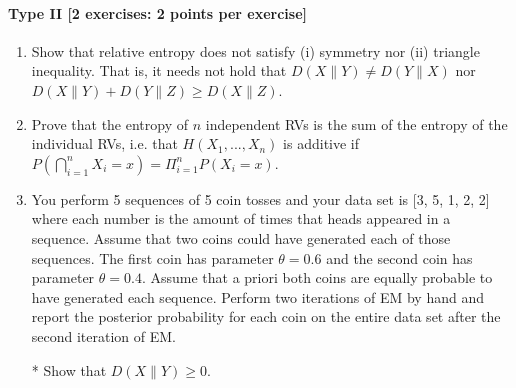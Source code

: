 \documentclass{article}
\begin{document}
\paragraph{Type II [2 exercises: 2 points per exercise]}
\begin{enumerate}
	\item Show that relative entropy does not satisfy (i) symmetry nor (ii) triangle inequality. That is, it needs not hold that $D(X\parallel Y) \neq  D(Y \parallel X)$ nor $D(X\parallel Y) + D(Y\parallel Z) \geq D(X \parallel Z)$.
	\item Prove that the entropy of $n$ independent RVs is the sum of the entropy of the individual RVs, i.e. that  $H(X_1, ..., X_n)$ is additive if $P(\bigcap_{i = 1}^{n} X_i=x) = \Pi_{i = 1}^n P(X_i=x)$.
	\item You perform 5 sequences of 5 coin tosses and your data set is  [3, 5, 1, 2, 2]  where each number
	is the amount of times that heads appeared in a sequence. Assume that two coins could have generated
	each of those sequences. The first coin has parameter $ \theta = 0.6 $ and the second coin has 
	parameter $ \theta = 0.4 $. Assume that a priori both coins are equally probable to have generated 
	each sequence. Perform two iterations of EM by hand and report the posterior probability for
	each coin on the entire data set after the second iteration of EM.
	\item[*] Show that $D(X\parallel Y) \geq 0$.

\end{enumerate}
\end{document}
